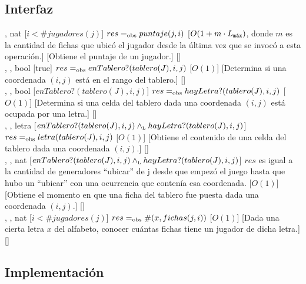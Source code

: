 \begin{interfaz}{\subsection{Interfaz}}
\begin{operaciones}
    \noindent{}
    {, }{nat}
    [$i < \#jugadores(j)$]
    {$res\igobs puntaje(j,i)$}
    [$O(1+m\cdot \Lmax)$, donde $m$ es la cantidad de fichas que ubicó el
jugador desde la última vez que se invocó a esta operación.]
    [Obtiene el puntaje de un jugador.]
    [\falta]\\

    \noindent{}
    {, , }{bool}
    [true]
    {$res\igobs enTablero?(tablero(J),i,j)$}
    [$O(1)$]
    [Determina si una coordenada $(i,j)$ está en el rango del tablero.]
    [\falta]\\

    \noindent{}
    {, , }{bool}
    [$enTablero?(tablero(J),i,j)$]
    {$res\igobs hayLetra?(tablero(J),i,j)$}
    [$O(1)$]
    [Determina si una celda del tablero dada una coordenada $(i,j)$ está ocupada por una letra.]
    [\falta]\\

    \noindent{}
    {, , }{letra}
    [$enTablero?(tablero(J),i,j)\yluego hayLetra?(tablero(J),i,j)$]
    {$res\igobs letra(tablero(J),i,j)$}
    [$O(1)$]
    [Obtiene el contenido de una celda del tablero dada una coordenada $(i,j)$.]
    [\falta]\\

    \noindent{}
    {, , }{nat}
    [$enTablero?(tablero(J),i,j)\yluego hayLetra?(tablero(J),i,j)$]
    {$res$ es igual a la cantidad de generadores ``ubicar'' de j desde que empezó el juego hasta que hubo un ``ubicar'' con una ocurrencia que contenía esa coordenada.}
    [$O(1)$]
    [Obtiene el momento en que una ficha del tablero fue puesta dada una coordenada $(i,j)$.]
    [\falta]\\

    \noindent{}
    {, , }{nat}
    [$i < \#jugadores(j)$]
    {$res\igobs \#(x,fichas(j,i))$}
    [$O(1)$]
    [Dada una cierta letra $x$ del alfabeto, conocer cuántas fichas tiene un jugador de dicha letra.]
    [\falta]\\

  \end{operaciones}
\end{interfaz}

\newpage
\subsection{Implementación}

